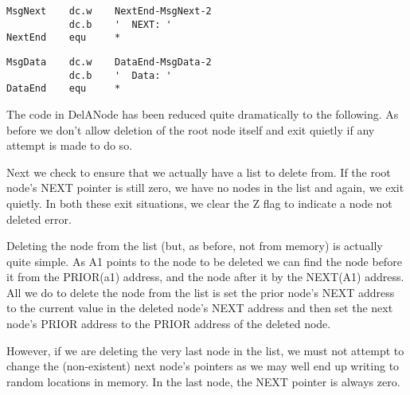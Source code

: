 \begin{lstlisting}[firstnumber=156,caption={Changes to MsgNext Text Data}]
MsgNext    dc.w    NextEnd-MsgNext-2
           dc.b    '  NEXT: '
NextEnd    equ     *
\end{lstlisting}


\begin{lstlisting}[firstnumber=167,caption={Changes to MsgData Text Data}]
MsgData    dc.w    DataEnd-MsgData-2
           dc.b    '  Data: '
DataEnd    equ     *
\end{lstlisting}

The code in DelANode has been reduced quite dramatically to the following. As before we
don't allow deletion of the root node itself and exit quietly if any attempt is made to
do so.

Next we check to ensure that we actually have a list to delete from. If the root
node's NEXT pointer is still zero, we have no nodes in the list and again, we exit
quietly. In both these exit situations, we clear the Z flag to indicate a node not
deleted error.

Deleting the node from the list (but, as before, not from memory) is actually quite
simple. As A1 points to the node to be deleted we can find the node before it from the
PRIOR(a1) address, and the node after it by the NEXT(A1) address. All we do to delete the
node from the list is set the prior node's NEXT address to the current value in the
deleted node's NEXT address and then set the next node's PRIOR address to the PRIOR
address of the deleted node.

However, if we are deleting the very last node in the list, we must not attempt to
change the (non-{}existent) next node's pointers as we may well end up writing to random
locations in memory. In the last node, the NEXT pointer is always zero.

